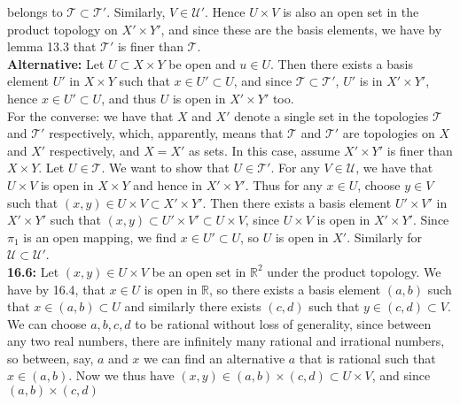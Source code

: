 \documentclass[a4paper]{article}
\begin{document}
        belongs to $\mathcal{T} \subset \mathcal{T}'$. Similarly, $V \in
        \mathcal{U}'$. Hence $U\times V$ is also an open set in the product
        topology on $X' \times Y'$, and since these are the basis elements, we
        have by lemma 13.3 that $\mathcal{T}'$ is finer than $\mathcal{T}$.\\
        \textbf{Alternative:} Let $U \subset X \times Y$ be open and $u \in U$.
        Then there exists a basis element $U'$ in $X \times Y$ such that $x \in
        U' \subset U$, and since $\mathcal{T} \subset \mathcal{T}'$, $U'$ is in
        $X' \times Y'$, hence $x \in U' \subset U$, and thus $U$ is open in
        $X' \times Y'$ too. \\
        \linebreak
        For the converse: we have that $X$ and $X'$ denote a single set in the
        topologies $\mathcal{T}$ and $\mathcal{T}'$ respectively, which,
        apparently, means that $\mathcal{T}$ and $\mathcal{T}'$ are topologies
        on $X$ and $X'$ respectively, and $X = X'$ as sets. In this case,
        assume $X' \times Y'$ is finer than $X \times Y$. Let
        $U \in \mathcal{T}$. We want to show that $U \in \mathcal{T}'$.
        For any $V \in \mathcal{U}$, we have that $U \times V$ is open in
        $X \times Y$ and hence in $X' \times Y'$. Thus for any
        $x \in U$, choose $y \in V$ such that $(x,y) \in U \times V \subset X'
        \times Y'$. Then there exists a basis element $U' \times V'$ in
        $X' \times Y'$ such that
        $(x,y) \subset U' \times V' \subset U \times V$, since $U \times V$ is
        open in $X' \times Y'$. Since $\pi_1$ is an open mapping, we find
        $x \in U' \subset U$, so $U$ is open in $X'$. Similarly for
        $\mathcal{U} \subset \mathcal{U}'$.\\
        \linebreak
        \textbf{16.6:} Let $(x,y) \in U\times V$ be an open set in $\mathbb{R}^2$ under
        the product topology. We have by 16.4, that $x \in U$ is open in
        $\mathbb{R}$, so there exists a basis element $(a,b)$ such that
        $x \in (a,b) \subset U$ and similarly there exists $(c,d)$ such that
        $y \in (c,d) \subset V$. We can choose $a,b,c,d$ to be rational without
        loss of generality, since between any two real numbers, there are
        infinitely many rational and irrational numbers, so between, say, $a$ 
        and $x$ we can find an alternative $a$ that is rational such that
        $x \in (a,b)$. Now we thus have $(x,y) \in 
        (a,b) \times (c,d) \subset U \times V$, and since $(a,b) \times (c,d)$ 
\end{document}
